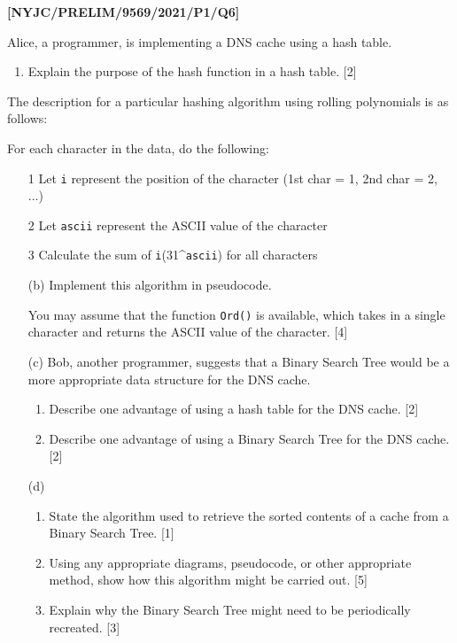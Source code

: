 \item \textbf{{[}NYJC/PRELIM/9569/2021/P1/Q6{]} }

Alice, a programmer, is implementing a DNS cache using a hash table. 
\begin{enumerate}
\item Explain the purpose of the hash function in a hash table. \hfill{}
{[}2{]}
\end{enumerate}
The description for a particular hashing algorithm using rolling polynomials
is as follows: 

\noindent %
\noindent\begin{minipage}[t]{1\columnwidth}%
For each character in the data, do the following: 
\begin{enumerate}
\item[1]  Let \texttt{i} represent the position of the character (1st char
= 1, 2nd char = 2, ...) 
\item[2]  Let \texttt{ascii} represent the ASCII value of the character 
\item[3]  Calculate the sum of \texttt{i}\texttimes (31\textasciicircum\texttt{ascii})
for all characters 
\end{enumerate}
%
\end{minipage}
\begin{enumerate}
\item[(b)]  Implement this algorithm in pseudocode. 

You may assume that the function \texttt{Ord()} is available, which
takes in a single character and returns the ASCII value of the character.
\hfill{} {[}4{]}
\item[(c)]  Bob, another programmer, suggests that a Binary Search Tree would
be a more appropriate data structure for the DNS cache. 
\begin{enumerate}
\item Describe one advantage of using a hash table for the DNS cache.\hfill{}
{[}2{]}
\item Describe one advantage of using a Binary Search Tree for the DNS cache.\hfill{}
{[}2{]}
\end{enumerate}
\item[(d)]  {}
\begin{enumerate}
\item State the algorithm used to retrieve the sorted contents of a cache
from a Binary Search Tree.\hfill{} {[}1{]}
\item Using any appropriate diagrams, pseudocode, or other appropriate method,
show how this algorithm might be carried out. \hfill{} {[}5{]}
\item Explain why the Binary Search Tree might need to be periodically recreated.\hfill{}
{[}3{]}
\end{enumerate}
\end{enumerate}